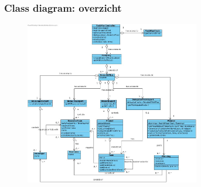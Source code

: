 \documentclass{beamer}
\begin{document}
%
%
%

\begin{frame}
\frametitle {Class diagram: overzicht}

\begin{figure}
\centering
\begin{center}
\includegraphics[width=0.68\textwidth]{figures/Class_diagram.jpg}
\end{center}
\end{figure}
\end{frame}

%
%   
%
\end{document}
